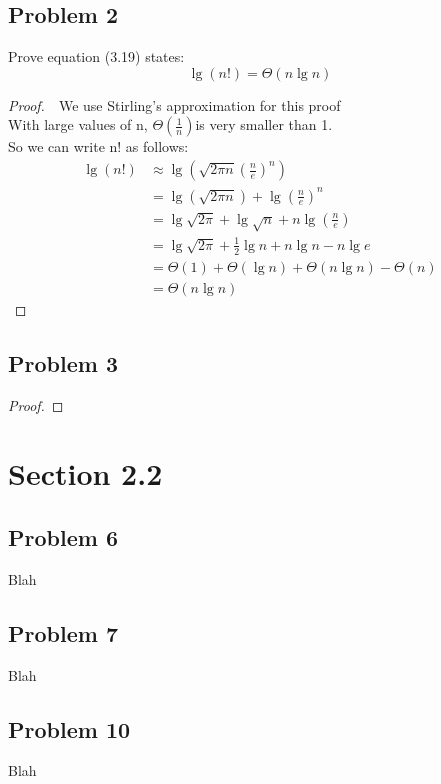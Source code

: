 \documentclass{article}
\begin{document}
\subsection*{Problem 2}
Prove equation (3.19) states: \begin{equation} \lg(n!) = \Theta(n \lg n)\end{equation}
\begin{proof}
    $ $\newline
    $ $\newline
    We use Stirling's approximation for this proof \\
    With large values of n, $\Theta (\frac{1}{n}) $is very smaller than 1. \\
    So we can write n! as follows: \\
    \begin{equation}
        \begin{aligned}
        \lg (n !) & \approx \lg \left(\sqrt{2 \pi n}\left(\frac{n}{e}\right)^n\right) \\
        & =\lg (\sqrt{2 \pi n})+\lg \left(\frac{n}{e}\right)^n \\
        & =\lg \sqrt{2 \pi}+\lg \sqrt{n}+n \lg \left(\frac{n}{e}\right) \\
        & =\lg \sqrt{2 \pi}+\frac{1}{2} \lg n+n \lg n-n \lg e \\
        & =\Theta(1)+\Theta(\lg n)+\Theta(n \lg n)-\Theta(n) \\
        & =\Theta(n \lg n)
        \end{aligned}
    \end{equation}
\end{proof}

\subsection*{Problem 3}
%
\begin{proof}
%
\end{proof}

\section*{Section 2.2}
%
\subsection*{Problem 6}
Blah
\subsection*{Problem 7}
Blah
\subsection*{Problem 10}
Blah
\end{document}
